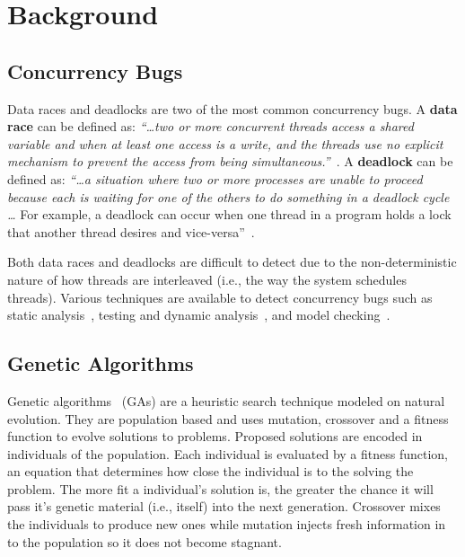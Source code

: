 \documentclass[runningheads,a4paper]{llncs}
\begin{document}
\section{Background}
\label{sec:background}

\subsection{Concurrency Bugs}
\label{sec:concurrency}

Data races and deadlocks are two of the most common concurrency bugs. A \textbf{data race} can be defined as: \textit{``\ldots two or more concurrent threads access a shared variable and when at least one access is a write, and the threads use no explicit mechanism to prevent the access from being simultaneous.''}~\cite{LSW07}. A \textbf{deadlock} can be defined as: \textit{``\ldots a situation where two or more processes are unable to proceed because each is waiting for one of the others to do something in a deadlock cycle \ldots} For example, a deadlock can occur when one thread in a program holds a lock that another thread desires and vice-versa''~\cite{LSW07}. 

Both data races and deadlocks are difficult to detect due to the non-deterministic nature of how threads are interleaved (i.e., the way the system schedules threads). Various techniques are available to detect concurrency bugs such as static analysis~\cite{NA07,NPSG09,HP04}, testing and dynamic analysis~\cite{EFN+02, HSU03, JNPS09}, and model checking~\cite{BHPV00,RDH03,OM03,MQB07,JM04,HP00}.





\subsection{Genetic Algorithms}
\label{sec:genetic_algorithms}

Genetic algorithms~\cite{GA92} (GAs) are a heuristic search technique modeled on natural evolution.  They are population based and uses mutation, crossover and a fitness function to evolve solutions to problems. Proposed solutions are encoded in individuals of the population. Each individual is evaluated by a fitness function, an equation that determines how close the individual is to the solving the problem. The more fit a individual's solution is, the greater the chance it will pass it's genetic material (i.e., itself) into the next generation. Crossover mixes the individuals to produce new ones while mutation injects fresh information in to the population so it does not become stagnant.
\end{document}
